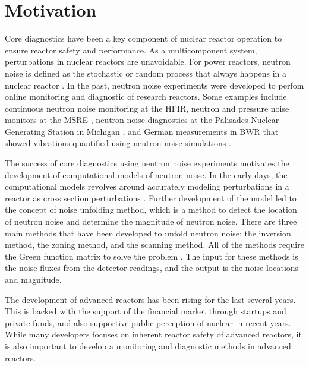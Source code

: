 \label{ch:introduction}

\section{Motivation}

Core diagnostics have been a key component of nuclear reactor operation to ensure reactor safety and performance. As a multicomponent system, perturbations in nuclear reactors are unavoidable. For power reactors, neutron noise is defined as the stochastic or random process that always happens in a nuclear reactor \cite{saitoTheoryPowerReactor1974b}. In the past, neutron noise experiments were developed to perfom online monitoring and diagnostic of research reactors. Some examples include continuous neutron noise monitoring at the \gls*{HFIR}, neutron and pressure noise monitors at the \gls*{MSRE} \cite{fryExperienceReactorMalfunction1971}, neutron noise diagnostics at the Palisades Nuclear Generating Station in Michigan \cite{fryAnalysisNeutrondensityOscillations1975}, and German measurements in \gls*{BWR} that showed vibrations quantified using neutron noise simulations \cite{wachInvestigationJointEffect1974}. 

The success of core diagnostics using neutron noise experiments motivates the development of computational models of neutron noise. In the early days, the computational models revolves around accurately modeling perturbations in a reactor as cross section perturbations \cite{saitoTheoryPowerReactor1974,saitoTheoryPowerReactor1974a}. Further development of the model led to the concept of noise unfolding method, which is a method to detect the location of neutron noise and determine the magnitude of neutron noise. There are three main methods that have been developed to unfold neutron noise: the inversion method, the zoning method, and the scanning method. All of the methods require the Green function matrix to solve the problem \cite{pazsitNoiseTechniquesNuclear2010}. The input for these methods is the noise fluxes from the detector readings, and the output is the noise locations and magnitude.

The development of advanced reactors has been rising for the last several years. This is backed with the support of the financial market through startups and private funds, and also supportive public perception of nuclear in recent years. While many developers focuses on inherent reactor safety of advanced reactors, it is also important to develop a monitoring and diagnostic methods in advanced reactors.

